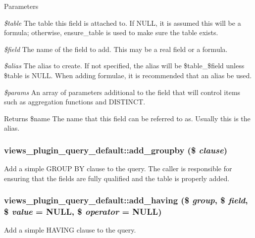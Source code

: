\begin{DoxyParams}{Parameters}
\item[{\em \$table}]The table this field is attached to. If NULL, it is assumed this will be a formula; otherwise, ensure\_\-table is used to make sure the table exists. \item[{\em \$field}]The name of the field to add. This may be a real field or a formula. \item[{\em \$alias}]The alias to create. If not specified, the alias will be \$table\_\-\$field unless \$table is NULL. When adding formulae, it is recommended that an alias be used. \item[{\em \$params}]An array of parameters additional to the field that will control items such as aggregation functions and DISTINCT.\end{DoxyParams}
\begin{DoxyReturn}{Returns}
\$name The name that this field can be referred to as. Usually this is the alias. 
\end{DoxyReturn}
\hypertarget{classviews__plugin__query__default_a3bf2adad02c8f1246cda9d200c09a750}{
\subsubsection[{add\_\-groupby}]{\setlength{\rightskip}{0pt plus 5cm}views\_\-plugin\_\-query\_\-default::add\_\-groupby (\$ {\em clause})}}
\label{classviews__plugin__query__default_a3bf2adad02c8f1246cda9d200c09a750}
Add a simple GROUP BY clause to the query. The caller is responsible for ensuring that the fields are fully qualified and the table is properly added. \hypertarget{classviews__plugin__query__default_a0c4fadff80c1a7df79b6fc286bf36a70}{
\subsubsection[{add\_\-having}]{\setlength{\rightskip}{0pt plus 5cm}views\_\-plugin\_\-query\_\-default::add\_\-having (\$ {\em group}, \/  \$ {\em field}, \/  \$ {\em value} = {\ttfamily NULL}, \/  \$ {\em operator} = {\ttfamily NULL})}}
\label{classviews__plugin__query__default_a0c4fadff80c1a7df79b6fc286bf36a70}
Add a simple HAVING clause to the query.


